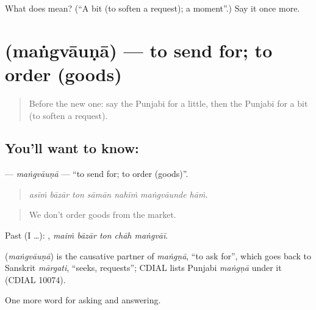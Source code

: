 \begin{tcolorbox}[breakable,colback=teal!4,colframe=teal!35!black,title={Before you move on}]
What does  mean? (\textquotedblleft{}A bit (to soften a request); a moment\textquotedblright{}.) Say it once more.
\end{tcolorbox}
\section[\texorpdfstring{\pa{ਮੰਗਵਾਉਣਾ} (maṅgvāuṇā)}{ਮੰਗਵਾਉਣਾ (maṅgvāuṇā)}]{ (maṅgvāuṇā) — to send for; to order (goods)}

\label{lesson:PA-C337-mangvauna}



\begin{quote}
Before the new one: say the Punjabi for a little, then the Punjabi for a bit (to soften a request).
\end{quote}

\subsection*{You'll want to know: }
\textbf{} — \emph{maṅgvāuṇā} — \textquotedblleft{}to send for; to order (goods)\textquotedblright{}.

\begin{quote}
      
\end{quote}

\begin{quote}
\emph{asīṁ bāzār ton sāmān nahīṁ maṅgvāunde hāṁ.}
\end{quote}

\begin{quote}
We don't order goods from the market.
\end{quote}

Past (I …):     , \emph{maiṁ bāzār ton chāh maṅgvāī}.

\begin{cousinweb}
\textbf{} (\emph{maṅgvāuṇā}) is the causative partner of \emph{maṅgṇā}, \textquotedblleft{}to ask for\textquotedblright{}, which goes back to Sanskrit \emph{mārgati}, \textquotedblleft{}seeks, requests\textquotedblright{}; CDIAL lists Punjabi \emph{maṅgṇā} under it (CDIAL 10074).
\end{cousinweb}

\begin{grammarlens}[title={What you've built}]
One more word for asking and answering.
\end{grammarlens}

